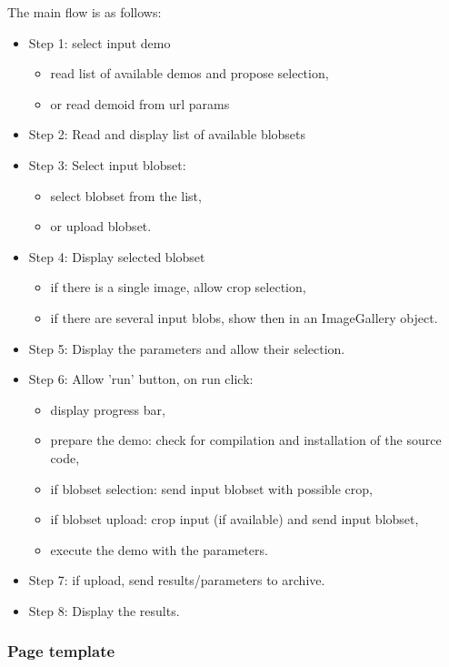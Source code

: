 The main flow is as follows:
\begin{itemize}
 \item Step 1: select input demo
    \begin{itemize}
      \item read list of available demos and propose selection,
      \item or read demoid from url params
    \end{itemize}
 \item Step 2: Read and display list of available blobsets 
 \item Step 3: Select input blobset:
    \begin{itemize}
      \item select blobset from the list,
      \item or upload blobset.
    \end{itemize}
 \item Step 4: Display selected blobset 
    \begin{itemize}
      \item if there is a single image, allow crop selection,
      \item if there are several input blobs, show then in an ImageGallery object.
    \end{itemize}
 \item Step 5: Display the parameters and allow their selection. 
 \item Step 6: Allow 'run' button, on run click: 
    \begin{itemize}
      \item display progress bar,
      \item prepare the demo: check for compilation and installation of the source code,
      \item if blobset selection: send input blobset with possible crop,
      \item if blobset upload: crop input (if available) and send input blobset,
      \item execute the demo with the parameters.
    \end{itemize}
 \item Step 7: if upload, send results/parameters to archive. 
 \item Step 8: Display the results.
\end{itemize}

\subsubsection{Page template}

